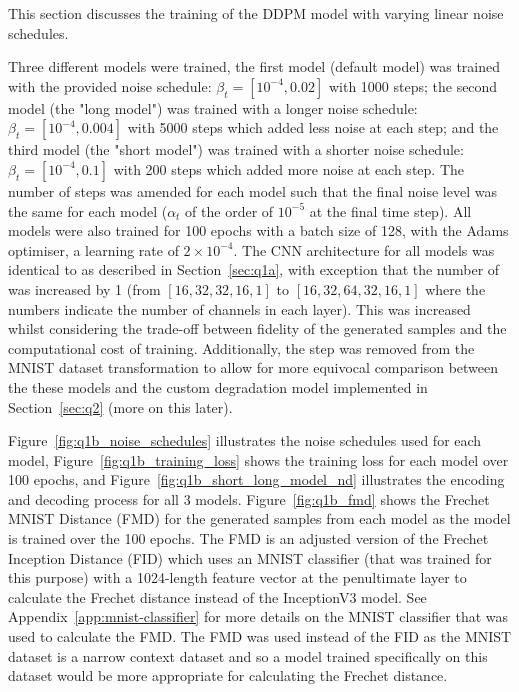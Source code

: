 This section discusses the training of the DDPM model with varying linear noise schedules.

Three different models were trained, the first model (default model) was trained with the provided noise schedule:
$\beta_{t} = [10^{-4}, 0.02]$ with 1000 steps; the second model (the "long model") was trained with a longer noise schedule:
$\beta_{t} = [10^{-4}, 0.004]$ with 5000 steps which added less noise at each step; and the third model (the "short model")
was trained with a shorter noise schedule: $\beta_{t} = [10^{-4}, 0.1]$ with 200 steps which added more noise at each step.
The number of steps was amended for each model such that the final noise level was the same for each model ($\alpha_{t}$
of the order of $10^{-5}$ at the final time step).
All models were also trained for 100 epochs with a batch size of 128, with the Adams optimiser, a learning rate of
$2 \times 10^{-4}$.
The CNN architecture for all models was identical to as described in Section~\eqref{sec:q1a}, with exception
that the number of  was increased by 1 (from $[16, 32, 32, 16, 1]$ to $[16, 32, 64, 32, 16, 1]$ where
the numbers indicate the number of channels in each layer).
This was increased whilst considering the trade-off between fidelity of the generated samples and the computational cost of training.
Additionally, the  step was removed from the MNIST dataset transformation
to allow for more equivocal comparison between the these models and the custom degradation model implemented in Section~\eqref{sec:q2}
(more on this later).

Figure~\eqref{fig:q1b_noise_schedules} illustrates the noise schedules used for each model, Figure~\eqref{fig:q1b_training_loss}
shows the training loss for each model over 100 epochs, and Figure~\eqref{fig:q1b_short_long_model_nd} illustrates the encoding
and decoding process for all 3 models.
Figure~\eqref{fig:q1b_fmd} shows the Frechet MNIST Distance (FMD) for the generated samples from each model as the model
is trained over the 100 epochs.
The FMD is an adjusted version of the Frechet Inception Distance (FID) which uses an MNIST classifier (that was trained
for this purpose) with a 1024-length feature vector at the penultimate layer to calculate the Frechet distance instead
of the InceptionV3 model.
See Appendix~\eqref{app:mnist-classifier} for more details on the MNIST classifier that was used to calculate the FMD.
The FMD was used instead of the FID as the MNIST dataset is a narrow context dataset and so a model trained specifically on this
dataset would be more appropriate for calculating the Frechet distance.

